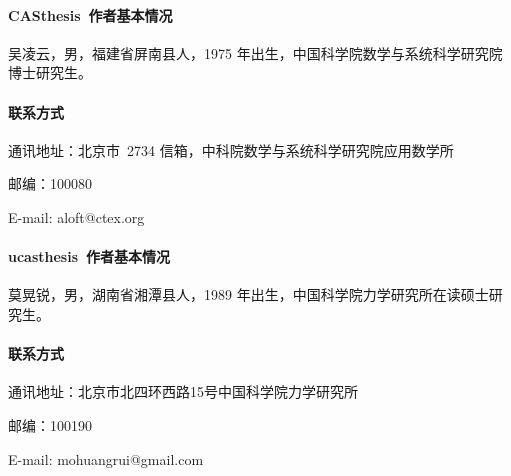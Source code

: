 
\begin{resume}

\paragraph{CASthesis~作者基本情况}
吴凌云，男，福建省屏南县人，1975 年出生，中国科学院数学与系统科学研究院博士研究生。

\paragraph{联系方式}
通讯地址：北京市~2734 信箱，中科院数学与系统科学研究院应用数学所

邮编：100080

E-mail: aloft@ctex.org

\paragraph{ucasthesis~作者基本情况}
莫晃锐，男，湖南省湘潭县人，1989 年出生，中国科学院力学研究所在读硕士研究生。

\paragraph{联系方式}
通讯地址：北京市北四环西路15号中国科学院力学研究所

邮编：100190

E-mail: mohuangrui@gmail.com

\end{resume}
